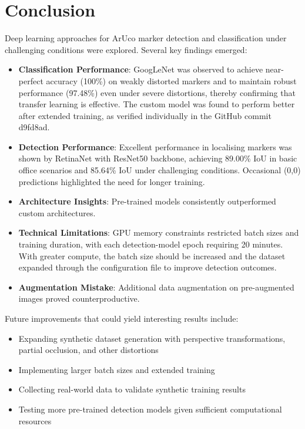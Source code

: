 \documentclass[conference]{IEEEtran}
\begin{document}
\section{Conclusion}

Deep learning approaches for ArUco marker detection and classification under challenging conditions were explored. Several key findings emerged:

\begin{itemize}
    \item \textbf{Classification Performance}: GoogLeNet was observed to achieve near-perfect accuracy (100\%) on weakly distorted markers
    and to maintain robust performance (97.48\%) even under severe distortions, thereby confirming that transfer learning is effective.
    The custom model was found to perform better after extended training, as verified individually in the GitHub commit d9fd8ad.
    
    \item \textbf{Detection Performance}: Excellent performance in localising markers was shown by RetinaNet with ResNet50 backbone, achieving
    89.00\% IoU in basic office scenarios and 85.64\% IoU under challenging conditions. Occasional (0,0) predictions highlighted the need 
    for longer training.
    
    \item \textbf{Architecture Insights}: Pre-trained models consistently outperformed custom architectures.
    
    \item \textbf{Technical Limitations}: GPU memory constraints restricted batch sizes and training duration, with each detection-model
    epoch requiring 20 minutes. With greater compute, the batch size should be increased and the dataset expanded through the configuration
    file to improve detection outcomes.

    \item \textbf{Augmentation Mistake}: Additional data augmentation on pre-augmented images proved counterproductive.
\end{itemize}

Future improvements that could yield interesting results include: 

\begin{itemize}
    \item Expanding synthetic dataset generation with perspective transformations, partial occlusion, and other distortions
    \item Implementing larger batch sizes and extended training
    \item Collecting real-world data to validate synthetic training results
    \item Testing more pre-trained detection models given sufficient computational resources
\end{itemize}
\end{document}
